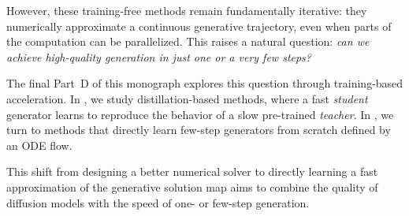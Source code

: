 However, these training-free methods remain fundamentally iterative: they
numerically approximate a continuous generative trajectory, even when parts of
the computation can be parallelized. This raises a natural question:
\emph{can we achieve high-quality generation in just one or a very few steps?}

The final Part~D of this monograph explores this question through
training-based acceleration. In , we study
distillation-based methods, where a fast \textit{student} generator learns to
reproduce the behavior of a slow pre-trained \textit{teacher}. In
, we turn to methods that directly learn few-step
generators from scratch defined by an ODE flow.

This shift from designing a better numerical solver to directly learning a
fast approximation of the generative solution map aims to combine the quality
of diffusion models with the speed of one- or few-step generation.


\clearpage
\newpage
